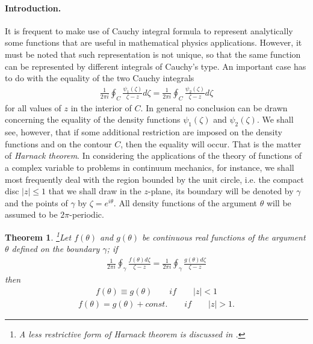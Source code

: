 \documentclass[12pt]{article}
\newtheorem{theorem*}{Theorem}
\begin{document}
\paragraph{Introduction.}
It is frequent to make use of Cauchy integral formula to represent analytically some functions that are useful in mathematical physics applications. However, it must be noted that such representation is not unique, so that the same function can be represented by different integrals of Cauchy's type. An important case has to do with the equality of the two Cauchy integrals
\begin{align*}
\frac{1}{2\pi i}\oint_C\frac{\psi_1(\zeta)}{\zeta-z}d\zeta=
\frac{1}{2\pi i}\oint_C\frac{\psi_2(\zeta)}{\zeta-z}d\zeta
\end{align*}
for all values of $z$ in the interior of $C$. In general no conclusion can be drawn concerning the equality of the density functions $\psi_1(\zeta)$ and $\psi_2(\zeta)$. We shall see, however, that if some additional restriction are imposed on the density functions and on the contour $C$, then the equality will occur. That is the matter of {\em Harnack theorem}. In considering the applications of the theory of functions of a complex variable to problems in continuum mechanics, for instance, we shall most frequently deal with the region bounded by the unit circle, i.e. the compact disc $|z|\leq 1$ that we shall draw  in the $z$-plane, its boundary will be denoted by $\gamma$ and the points of $\gamma$ by $\zeta=e^{i\theta}$. All density functions of the argument $\theta$ will be assumed to be $2\pi$-periodic.
\begin{theorem*}
{\footnote{A less restrictive form of Harnack theorem is discussed in \cite{cite:Musk}.}}Let $f(\theta)$ and $g(\theta)$ be continuous real functions of the argument $\theta$ defined on the boundary $\gamma$; if
\begin{align}
\frac{1}{2\pi i}\oint_\gamma\frac{f(\theta)d\zeta}{\zeta-z}=
\frac{1}{2\pi i}\oint_\gamma\frac{g(\theta)d\zeta}{\zeta-z}
\end{align}
then
\begin{align*}
f(\theta)\equiv g(\theta) \qquad if \qquad |z|<1
\end{align*}
\begin{align*}
f(\theta)=g(\theta)+const. \qquad if \qquad |z|>1.
\end{align*}
\end{theorem*}
\end{document}
